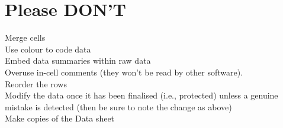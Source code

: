 \documentclass[12pt]{article} %
\begin{document}
\section{Please DON'T}
 Merge cells\\
 Use colour to code data\\
 Embed data summaries within raw data\\
 Overuse in-cell comments (they won't be read by other software).\\
 Reorder the rows\\
 Modify the data once it has been finalised (i.e., protected) unless a genuine mistake is detected (then be sure to note the change as above)\\
 Make copies of the Data sheet\\
\end{document}
